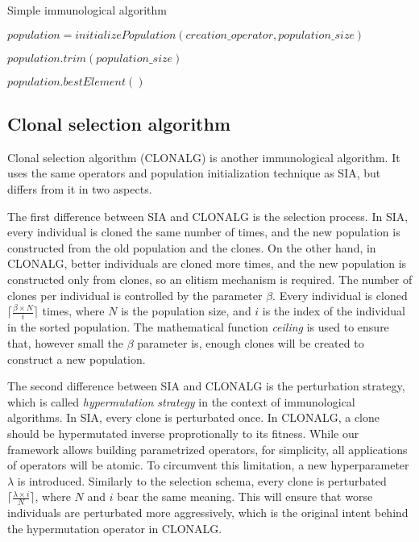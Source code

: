 \begin{algorithm}[!htbp]
    \caption{Simple immunological algorithm}
    \label{alg:sia}

    $population = initializePopulation(creation\_operator, population\_size)$\;

     {
        $population.trim(population\_size)$\;
    }

    \Return $population.bestElement()$\;
    \end{algorithm}

\subsection{Clonal selection algorithm}
\label{sec:clonalg}

Clonal selection algorithm (CLONALG) \citep{clonalg} is another immunological algorithm. It uses the same operators and population initialization technique as SIA, but differs from it in two aspects. 

The first difference between SIA and CLONALG is the selection process. In SIA, every individual is cloned the same number of times, and the new population is constructed from the old population and the clones. On the other hand, in CLONALG, better individuals are cloned more times, and the new population is constructed only from clones, so an elitism mechanism is required. The number of clones per individual is controlled by the parameter $\beta$. Every individual is cloned $\lceil \frac{\beta \times N}{i} \rceil$ times, where $N$ is the population size, and $i$ is the index of the individual in the sorted population. The mathematical function \textit{ceiling} is used to ensure that, however small the $\beta$ parameter is, enough clones will be created to construct a new population.

The second difference between SIA and CLONALG is the perturbation strategy, which is called \textit{hypermutation strategy} in the context of immunological algorithms. In SIA, every clone is perturbated once. In CLONALG, a clone should be hypermutated inverse proprotionally to its fitness. While our framework allows building parametrized operators, for simplicity, all applications of operators will be atomic. To circumvent this limitation, a new hyperparameter $\lambda$ is introduced. Similarly to the selection schema, every clone is perturbated $\lceil \frac{\lambda \times i}{N} \rceil$, where $N$ and $i$ bear the same meaning. This will ensure that worse individuals are perturbated more aggressively, which is the original intent behind the hypermutation operator in CLONALG.

